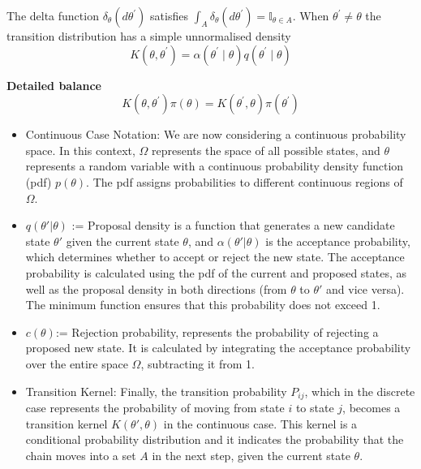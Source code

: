 \documentclass{article}
\begin{document}
The delta function $\delta_\theta\left(d \theta^{\prime}\right)$ satisfies $\int_A \delta_\theta\left(d \theta^{\prime}\right)=\mathbb{I}_{\theta \in A}$.
When $\theta^{\prime} \neq \theta$ the transition distribution has a simple unnormalised density
$$
K\left(\theta, \theta^{\prime}\right)=\alpha\left(\theta^{\prime} \mid \theta\right) q\left(\theta^{\prime} \mid \theta\right)
$$

\textbf{Detailed balance} 
$$
K\left(\theta, \theta^{\prime}\right) \pi(\theta)=K\left(\theta^{\prime}, \theta\right) \pi\left(\theta^{\prime}\right)
$$

\begin{itemize}
    \item Continuous Case Notation: We are now considering a continuous probability space. In this context, \(\Omega\) represents the space of all possible states, and \(\theta\) represents a random variable with a continuous probability density function (pdf) \( p(\theta) \). The pdf assigns probabilities to different continuous regions of \(\Omega\).
    \item  \( q(\theta'|\theta) \) := Proposal density is a function that generates a new candidate state \(\theta'\) given the current state \(\theta\), and \( \alpha(\theta'|\theta) \) is the acceptance probability, which determines whether to accept or reject the new state. The acceptance probability is calculated using the pdf of the current and proposed states, as well as the proposal density in both directions (from \(\theta\) to \(\theta'\) and vice versa). The minimum function ensures that this probability does not exceed 1.
    \item  \( c(\theta) \):= Rejection probability, represents the probability of rejecting a proposed new state. It is calculated by integrating the acceptance probability over the entire space \(\Omega\), subtracting it from 1.
    \item Transition Kernel: Finally, the transition probability \( P_{ij} \), which in the discrete case represents the probability of moving from state \( i \) to state \( j \), becomes a transition kernel \( K(\theta',\theta) \) in the continuous case. This kernel is a conditional probability distribution and it indicates the probability that the chain moves into a set \( A \) in the next step, given the current state \( \theta \).
\end{itemize}
\end{document}
